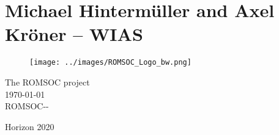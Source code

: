 \documentclass{ROMSOC}
\begin{document}
\part[~(Michael Hintermüller and Axel Kröner -- WIAS)]{\normalsize Michael Hintermüller and Axel Kröner -- WIAS}


%

%


\label{finalpg}
\clearpage

\thispagestyle{empty}
\begin{center}
\vfill
\begin{figure}
\centering
\vspace{7cm}
  \texttt{[image: ../images/ROMSOC\_Logo\_bw.png]}
\end{figure}
\vfill
{\large The ROMSOC project\\[0.5cm] }
{\large \today \\[0.5cm] }
{\large ROMSOC-\DelNumber-\DelVersion\\[0.5cm] }
\vfill

Horizon 2020

\end{center}
\end{document}

